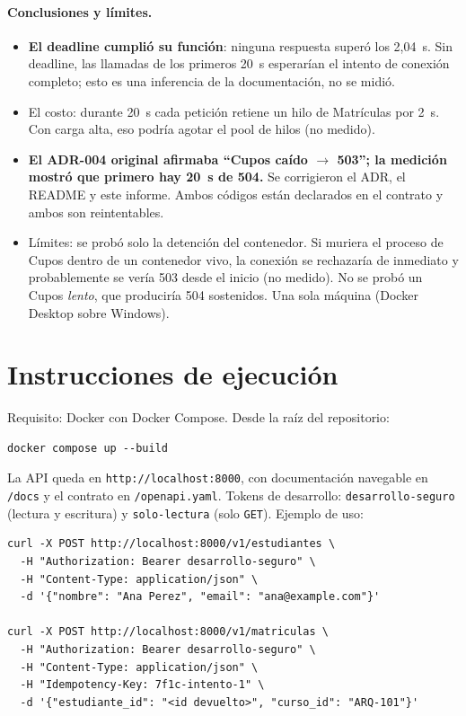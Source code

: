 \documentclass[11pt,spanish]{article}
\begin{document}
\paragraph{Conclusiones y límites.}
\begin{itemize}
    \item \textbf{El deadline cumplió su función}: ninguna respuesta superó los 2,04~s. Sin deadline, las llamadas de los primeros 20~s esperarían el intento de conexión completo; esto es una inferencia de la documentación, no se midió.
    \item El costo: durante 20~s cada petición retiene un hilo de Matrículas por 2~s. Con carga alta, eso podría agotar el pool de hilos (no medido).
    \item \textbf{El ADR-004 original afirmaba ``Cupos caído $\to$ 503''; la medición mostró que primero hay 20~s de 504.} Se corrigieron el ADR, el README y este informe. Ambos códigos están declarados en el contrato y ambos son reintentables.
    \item Límites: se probó solo la detención del contenedor. Si muriera el proceso de Cupos dentro de un contenedor vivo, la conexión se rechazaría de inmediato y probablemente se vería 503 desde el inicio (no medido). No se probó un Cupos \emph{lento}, que produciría 504 sostenidos. Una sola máquina (Docker Desktop sobre Windows).
\end{itemize}

\section{Instrucciones de ejecución}\label{sec:ejecucion}

Requisito: Docker con Docker Compose. Desde la raíz del repositorio:

\begin{verbatim}
docker compose up --build
\end{verbatim}

La API queda en \texttt{http://localhost:8000}, con documentación navegable en \texttt{/docs} y el contrato en \texttt{/openapi.yaml}. Tokens de desarrollo: \texttt{desarrollo-seguro} (lectura y escritura) y \texttt{solo-lectura} (solo \texttt{GET}). Ejemplo de uso:

\begin{verbatim}
curl -X POST http://localhost:8000/v1/estudiantes \
  -H "Authorization: Bearer desarrollo-seguro" \
  -H "Content-Type: application/json" \
  -d '{"nombre": "Ana Perez", "email": "ana@example.com"}'

curl -X POST http://localhost:8000/v1/matriculas \
  -H "Authorization: Bearer desarrollo-seguro" \
  -H "Content-Type: application/json" \
  -H "Idempotency-Key: 7f1c-intento-1" \
  -d '{"estudiante_id": "<id devuelto>", "curso_id": "ARQ-101"}'
\end{verbatim}
\end{document}
